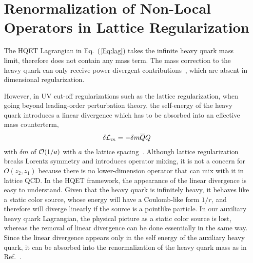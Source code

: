 \section{Renormalization of Non-Local Operators in Lattice Regularization}

The HQET Lagrangian in Eq.~(\ref{Eq:lag}) takes the infinite heavy quark mass limit,
therefore does not contain any mass term. The mass correction to the heavy quark can only receive power divergent contributions~\cite{Maiani:1991az}, which are absent in dimensional regularization.

However, in UV cut-off regularizations such as the lattice regularization,
when going beyond leading-order perturbation theory, the self-energy of the heavy quark introduces a linear divergence which
has to be absorbed into an effective mass counterterm,
\begin{equation}
    \delta {\cal L}_m =  -\delta m\overline{Q} Q
\end{equation}
with $\delta m$ of ${\cal O}(1/a)$ with $a$ the lattice spacing~\cite{Maiani:1991az}. Although lattice regularization breaks Lorentz symmetry and introduces operator mixing, it is not a concern for $O(z_2,z_1)$ because there is no lower-dimension operator that can mix with it in lattice QCD.
In the HQET framework, the appearance of the linear divergence is easy to understand. Given that the heavy quark is infinitely heavy, it behaves like a static color source, whose energy will have a Coulomb-like form $1/r$, and therefore will diverge linearly if the source is a pointlike particle.
In our auxiliary heavy quark Lagrangian, the physical picture as a static color source is lost, whereas the removal of linear divergence can be done essentially in the same way. Since the linear divergence appears only in the self energy of the auxiliary heavy quark, it can be absorbed into the renormalization of the heavy quark mass as in Ref.~\cite{Maiani:1991az}.

